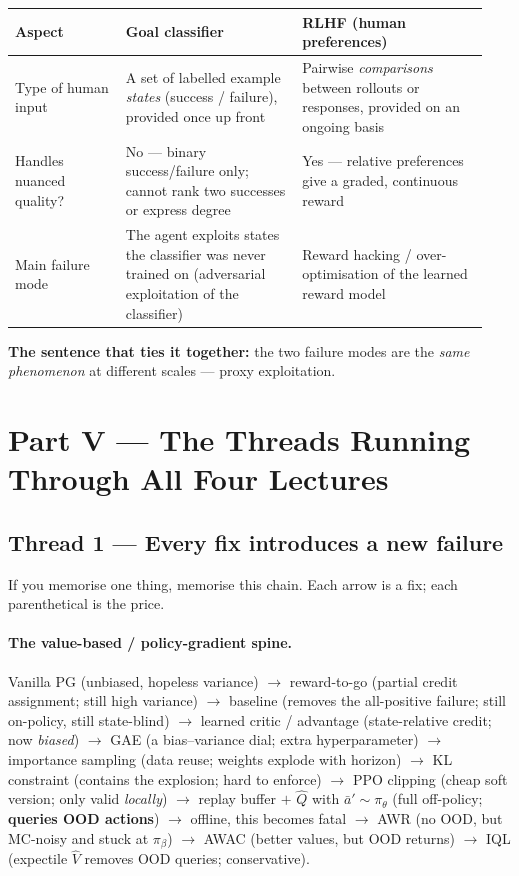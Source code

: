 \documentclass[11pt,a4paper]{article}
\begin{document}
\begin{center}
\begin{tabular}{@{}p{0.22\linewidth}p{0.35\linewidth}p{0.37\linewidth}@{}}
\toprule
\textbf{Aspect} & \textbf{Goal classifier} & \textbf{RLHF (human preferences)} \\
\midrule
Type of human input & A set of labelled example \emph{states} (success / failure), provided once up front & Pairwise \emph{comparisons} between rollouts or responses, provided on an ongoing basis \\
\addlinespace
Handles nuanced quality? & No --- binary success/failure only; cannot rank two successes or express degree & Yes --- relative preferences give a graded, continuous reward \\
\addlinespace
Main failure mode & The agent exploits states the classifier was never trained on (adversarial exploitation of the classifier) & Reward hacking / over-optimisation of the learned reward model \\
\bottomrule
\end{tabular}
\end{center}

\noindent\textbf{The sentence that ties it together:} the two failure modes
are the \emph{same phenomenon} at different scales --- proxy exploitation.

\newpage
\section{Part V --- The Threads Running Through All Four Lectures}

\subsection{Thread 1 --- Every fix introduces a new failure}

If you memorise one thing, memorise this chain. Each arrow is a fix; each
parenthetical is the price.

\paragraph{The value-based / policy-gradient spine.}
Vanilla PG (unbiased, hopeless variance)
$\rightarrow$ reward-to-go (partial credit assignment; still high variance)
$\rightarrow$ baseline (removes the all-positive failure; still on-policy, still state-blind)
$\rightarrow$ learned critic / advantage (state-relative credit; now \emph{biased})
$\rightarrow$ GAE (a bias--variance dial; extra hyperparameter)
$\rightarrow$ importance sampling (data reuse; weights explode with horizon)
$\rightarrow$ KL constraint (contains the explosion; hard to enforce)
$\rightarrow$ PPO clipping (cheap soft version; only valid \emph{locally})
$\rightarrow$ replay buffer $+$ $\hat Q$ with $\bar a'\sim\pi_\theta$ (full off-policy; \textbf{queries OOD actions})
$\rightarrow$ offline, this becomes fatal
$\rightarrow$ AWR (no OOD, but MC-noisy and stuck at $\pi_\beta$)
$\rightarrow$ AWAC (better values, but OOD returns)
$\rightarrow$ IQL (expectile $\hat V$ removes OOD queries; conservative).
\end{document}
